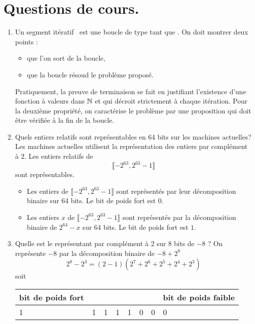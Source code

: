 

\section{Questions de cours.}
\begin{enumerate}
  \item Un \og segment itératif\fg~ est une boucle de type \og tant que \fg. On doit montrer deux points :
\begin{itemize}
  \item que l'on sort de la boucle,
  \item que la boucle résoud le problème proposé.
\end{itemize}
Pratiquement, la preuve de terminaison se fait en justifiant l'existence d'une fonction à valeurs dans $\mathbb{N}$ et qui décroit strictement à chaque itération. Pour la deuxième propriété, on caractérise le problème par une proposition qui doit être vérifiée à la fin de la boucle.
  
  \item Quels entiers relatifs sont représentables en 64 bits sur les machines actuelles?
Les machines actuelles utilisent la représentation des entiers par complément à $2$. Les entiers relatifs de
\begin{displaymath} 
  \llbracket -2^{63} , 2^{63} -1 \rrbracket
\end{displaymath}
sont représentables.
\begin{itemize}
  \item Les entiers de $\llbracket -2^{63} , 2^{63} -1 \rrbracket$ sont représentés par leur décomposition binaire sur 64 bits. Le bit de poids fort est $0$.
  \item Les entiers $x$ de $\llbracket -2^{63} , 2^{63} -1 \rrbracket$ sont représentés par la décomposition binaire de $2^{64} -x$ sur 64 bits. Le bit de poids fort est $1$.
\end{itemize}

  \item Quelle est le représentant par complément à 2 sur 8 bits de $-8$ ? \newline
On représente $-8$ par la décomposition binaire de $-8 + 2^{8}$
\begin{displaymath}
  2^{8} - 2^{3} = (2-1)(2^{7} +2^{6} +2^{5} +2^{4} +2^{3})
\end{displaymath}
soit
\begin{center}
\begin{tabular}{|l|l|l|l|l|l|l|l|} \hline
bit de poids fort &   &   &   &   &   &   & bit de poids faible \\ \hline
1 & 1 & 1 & 1 & 1 & 0 & 0 & 0 \\ \hline
\end{tabular}
\end{center}

\end{enumerate}

